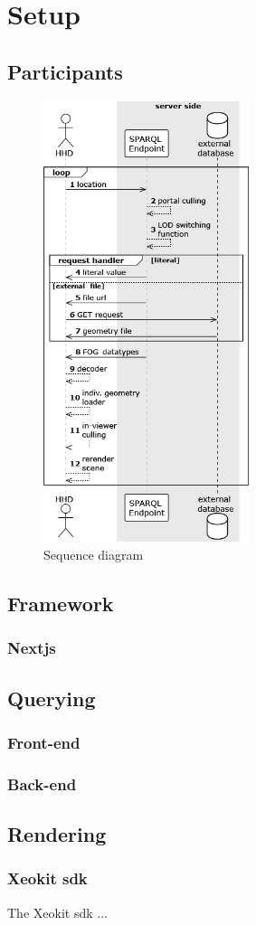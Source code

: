 \chapter{Setup}
\section{Participants}
\begin{figure}[h]
    \centering
    \includegraphics[width=6cm]{./figures/sequenceDiagram.png}
    \caption{Sequence diagram}
    \label{fig:sequendeDiagram}
\end{figure}
\section{Framework}
\subsection{Nextjs}
\section{Querying}
\subsection{Front-end}
\subsection{Back-end}
\section{Rendering}
\subsection{Xeokit \acs{sdk}}
The Xeokit \ac{sdk} ...